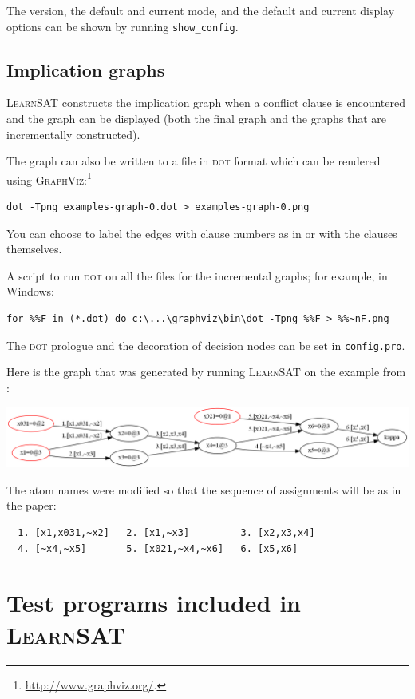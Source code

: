 \documentclass[11pt]{article}
\newcommand*{\p}[1]{\textup{\texttt{#1}}}
\newcommand*{\ls}{\textsc{LearnSAT}}
\newcommand*{\dt}{\textsc{dot}}
\begin{document}
The version, the default and current mode, and the default and current
display options can be shown by running \p{show\_config}.

\subsection{Implication graphs}\label{s.impl}

\ls{} constructs the implication graph when a conflict clause is
encountered and the graph can be displayed (both the final graph and the
graphs that are incrementally constructed). 

The graph can
also be written to a file in \dt{} format which can be rendered using
\textsc{GraphViz}:\footnote{\url{http://www.graphviz.org/}.}

\begin{verbatim}
dot -Tpng examples-graph-0.dot > examples-graph-0.png
\end{verbatim}
You can choose to label the edges with clause numbers as in \cite{mlm}
or with the clauses themselves.

A script to run \dt{} on all the files for the incremental graphs; for
example, in Windows:
\begin{verbatim}
for %%F in (*.dot) do c:\...\graphviz\bin\dot -Tpng %%F > %%~nF.png
\end{verbatim}

The \dt{} prologue and the decoration of decision nodes can be set in
\p{config.pro}.

\pagebreak[3]

Here is the graph that was generated by running \ls{} on the example
from \cite{mlm}:
\begin{center}
\includegraphics[keepaspectratio=true,width=\textwidth]{graph}
\end{center}
The atom names were modified so that the sequence of assignments
will be as in the paper:
\begin{verbatim}
  1. [x1,x031,~x2]   2. [x1,~x3]         3. [x2,x3,x4]
  4. [~x4,~x5]       5. [x021,~x4,~x6]   6. [x5,x6]
\end{verbatim}

\section{Test programs included in \ls{}}
\end{document}
